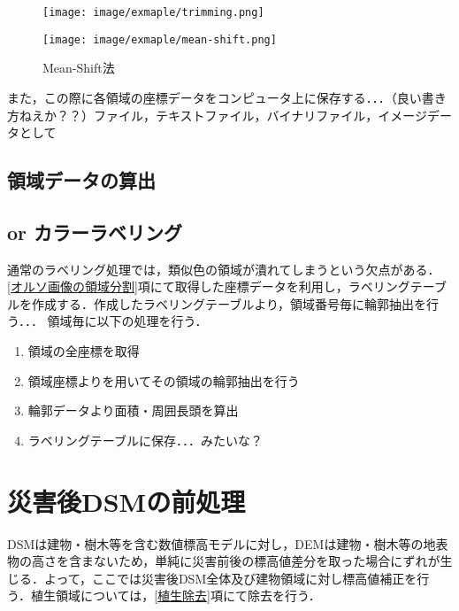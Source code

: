       \begin{figure}[t]
        \begin{minipage}[c]{0.45\hsize}
          \centering
          \texttt{[image: image/exmaple/trimming.png]}
          \label{Mean−Shift法入力}
        \end{minipage}
        \begin{minipage}[c]{0.45\hsize}
          \centering
          \texttt{[image: image/exmaple/mean-shift.png]}
          \label{Mean−Shift法出力}
        \end{minipage}
        \caption{Mean-Shift法}
      \end{figure}

      また，この際に各領域の座標データをコンピュータ上に保存する．．．（良い書き方ねえか？？）ファイル，テキストファイル，バイナリファイル，イメージデータとして

    \subsection{領域データの算出}

    \subsection{or カラーラベリング}
      通常のラベリング処理では，類似色の領域が潰れてしまうという欠点がある．
      \ref{オルソ画像の領域分割}項にて取得した座標データを利用し，ラベリングテーブルを作成する．作成したラベリングテーブルより，領域番号毎に輪郭抽出を行う．．．
      領域毎に以下の処理を行う．
      \begin{enumerate}
        \setlength{\itemsep}{-5pt}
        \item 領域の全座標を取得
        \item 領域座標よりを用いてその領域の輪郭抽出を行う
        \item 輪郭データより面積・周囲長頭を算出
        \item ラベリングテーブルに保存．．．みたいな？
      \end{enumerate}
      


  \section{災害後DSMの前処理}
    DSMは建物・樹木等を含む数値標高モデルに対し，DEMは建物・樹木等の地表物の高さを含まないため，単純に災害前後の標高値差分を取った場合にずれが生じる．よって，ここでは災害後DSM全体及び建物領域に対し標高値補正を行う．植生領域については，\ref{植生除去}項にて除去を行う．

